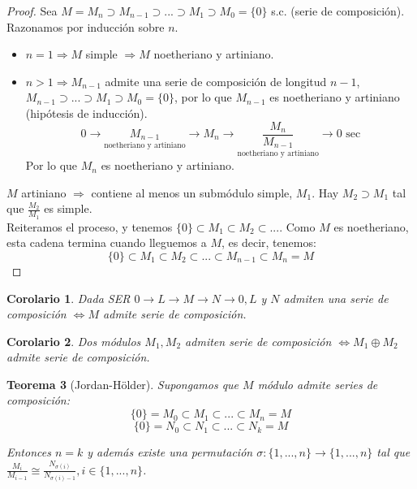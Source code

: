 \documentclass[11pt,a4paper]{article}
\newcommand*{\circled}[2][]{\tikz[baseline=(C.base)]{
	\node[inner sep=0pt] (C) {\vphantom{1g}#2};
	\node[draw, circle, inner sep=1pt, yshift=1pt]
		at (C.center) {\vphantom{1g}};}}
\theoremstyle{break}
\newtheorem{theorem}{Teorema}[section]
\newtheorem{corollary}[theorem]{Corolario}
\begin{document}
\begin{proof}
\circled{$\Rightarrow$} Sea $M = M_{n} \supset M_{n-1} \supset ... \supset M_{1} \supset M_{0} = \{0\}$ s.c. (serie de composición). Razonamos por inducción sobre $n$.
\begin{itemize}
\item $n = 1 \Rightarrow M$ simple $\Rightarrow M$ noetheriano y artiniano.
\item $n > 1 \Rightarrow M_{n-1}$ admite una serie de composición de longitud $n-1$, $M_{n-1} \supset ... \supset M_{1} \supset M_{0} = \{0\}$, por lo que $M_{n-1}$ es noetheriano y artiniano (hipótesis de inducción).
$$0 \to \underset{\text{noetheriano y artiniano}}{M_{n-1}} \to M_{n} \to \underset{\text{noetheriano y artiniano}}{\frac{M_{n}}{M_{n-1}}} \to 0 \text{ sec}$$
Por lo que $M_{n}$ es noetheriano y artiniano.
\end{itemize}

\circled{$\Leftarrow$} $M$ artiniano $\Rightarrow$ contiene al menos un submódulo simple, $M_{1}$. Hay $M_{2} \supset M_{1}$ tal que $\frac{M_{2}}{M_{1}}$ es simple. \\
Reiteramos el proceso, y tenemos $\{0\} \subset M_{1} \subset M_{2} \subset ...$. Como $M$ es noetheriano, esta cadena termina cuando lleguemos a $M$, es decir, tenemos:
$$\{0\} \subset M_{1} \subset M_{2} \subset ... \subset M_{n-1} \subset M_{n} = M$$
\end{proof}


\begin{corollary}
Dada SER $0 \to L \to M \to N \to 0, L$ y $N$ admiten una serie de composición $\iff M$ admite serie de composición.
\end{corollary}

\begin{corollary}
Dos módulos $M_{1}, M_{2}$ admiten serie de composición $\iff M_{1} \oplus M_{2}$ admite serie de composición.
\end{corollary}

\begin{theorem}[Jordan-Hölder]
Supongamos que $M$ módulo admite series de composición:
$$\{0\} = M_{0} \subset M_{1} \subset ... \subset M_{n} = M$$
$$\{0\} = N_{0} \subset N_{1} \subset ... \subset N_{k} = M$$

Entonces $n = k$ y además existe una permutación $\sigma: \{1, ..., n\} \to \{1, ..., n\}$ tal que $\frac{M_{i}}{M_{i-1}} \cong \frac{N_{\sigma(i)}}{N_{\sigma(i)-1}}, i \in \{1, ..., n\}$.
\end{theorem}
\end{document}
